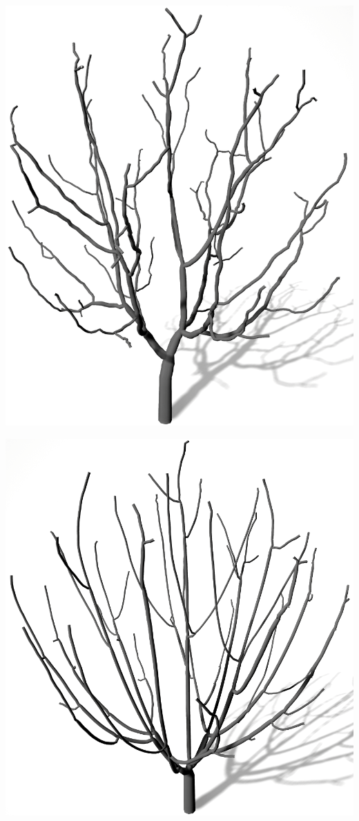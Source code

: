 \newpage
\begin{center}
	\vfill
	\begin{minipage}[c]{0.45\textwidth}
		\centering
		\includegraphics[height=.9\textheight]{images/SCA_KDRI_HighKD_LowRI}
	\end{minipage}
	\hspace{.05\textwidth}	
	\begin{minipage}[c]{0.45\textwidth}
		\centering
		\includegraphics[height=.9\textheight]{images/SCA_KDRI_HighKD_HighRI}

\end{minipage}
\end{center}
